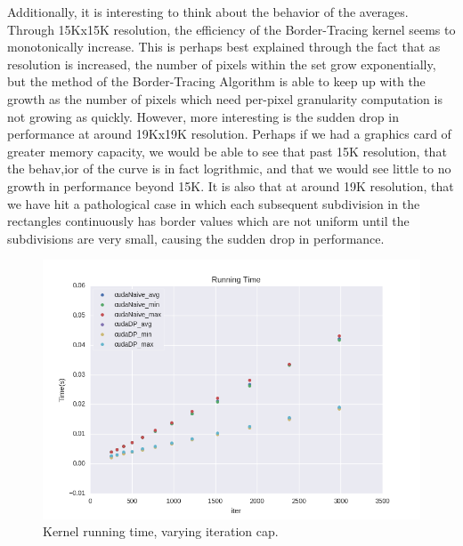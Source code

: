 \documentclass[letterpaper]{article}
\begin{document}
\begin{multicols}{2}
Additionally, it is interesting to think about the behavior of the averages.
  Through 15Kx15K resolution, the efficiency of the Border-Tracing kernel seems
  to monotonically increase. This is perhaps best explained through the fact
  that as resolution is increased, the number of pixels within the set grow
  exponentially, but the method of the Border-Tracing Algorithm is able to keep
  up with the growth as the number of pixels which need per-pixel granularity
  computation is not growing as quickly. 
However, more interesting is the sudden drop in performance at around 19Kx19K
  resolution. Perhaps if we had a graphics card of greater memory capacity, we
  would be able to see that past 15K resolution, that the behav,ior of the curve
  is in fact logrithmic, and that we would see little to no growth in
  performance beyond 15K. 
It is also that at around 19K resolution, that we have hit a pathological case
  in which each subsequent subdivision in the rectangles continuously has border
  values which are not uniform until the subdivisions are very small, causing
  the sudden drop in performance.

\begin{figure}[H]
  \includegraphics[width=\linewidth]{experiments3/running_time_graph_exp_iter.png}
  \caption{Kernel running time, varying iteration cap.}
  \label{fig:rtIter}
\end{figure}


\end{multicols}
\end{document}

